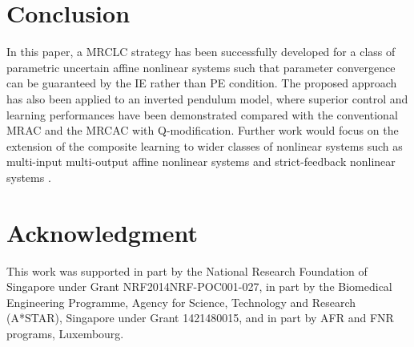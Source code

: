 \documentclass[conference]{IEEEtran}
\begin{document}
\section{Conclusion}

In this paper, a MRCLC strategy has been successfully developed for a class of parametric uncertain affine nonlinear systems such that parameter convergence can be guaranteed by the IE rather than PE condition. The proposed approach has also been applied to an inverted pendulum model, where superior control and learning performances have been demonstrated compared with the conventional MRAC and the MRCAC with Q-modification. Further work would focus on the extension of the composite learning to wider classes of nonlinear systems such as multi-input multi-output affine nonlinear systems \cite{Pan2013a} and strict-feedback nonlinear systems \cite{Pan2015}.


\section*{Acknowledgment}

This work was supported in part by the National Research Foundation of Singapore under Grant NRF2014NRF-POC001-027, in part by the Biomedical Engineering Programme, Age\-ncy for Science, Technology and Research (A*STAR), Sing\-apore under Grant 1421480015, and in part by AFR and FNR programs, Luxembourg.
\end{document}
